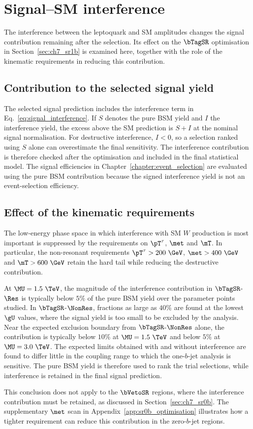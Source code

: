 \chapter{Signal--SM interference}
\label{app:signal_interference_study}

The interference between the leptoquark and SM amplitudes changes the signal contribution remaining after the selection.
Its effect on the $\bTagSR$ optimisation in Section~\ref{sec:ch7_sr1b} is examined here, together with the role of the kinematic requirements in reducing this contribution.

\section{Contribution to the selected signal yield}

The selected signal prediction includes the interference term in Eq.~\ref{eq:signal_interference}.
If $S$ denotes the pure BSM yield and $I$ the interference yield, the excess above the SM prediction is $S+I$ at the nominal signal normalisation.
For destructive interference, $I<0$, so a selection ranked using $S$ alone can overestimate the final sensitivity.
The interference contribution is therefore checked after the optimisation and included in the final statistical model.
The signal efficiencies in Chapter~\ref{chapter:event_selection} are evaluated using the pure BSM contribution because the signed interference yield is not an event-selection efficiency.

\section{Effect of the kinematic requirements}

The low-energy phase space in which interference with SM $W$ production is most important is suppressed by the requirements on $\pT^\tau$, $\met$ and $\mT$.
In particular, the non-resonant requirements $\pT^\tau>200~\GeV$, $\met>400~\GeV$ and $\mT>600~\GeV$ retain the hard tail while reducing the destructive contribution.

At $\MU=1.5~\TeV$, the magnitude of the interference contribution in $\bTagSR$-$\Res$ is typically below $5\%$ of the pure BSM yield over the parameter points studied.
In $\bTagSR$-$\NonRes$, fractions as large as $40\%$ are found at the lowest $\gU$ values, where the signal yield is too small to be excluded by the analysis.
Near the expected exclusion boundary from $\bTagSR$-$\NonRes$ alone, the contribution is typically below $10\%$ at $\MU=1.5~\TeV$ and below $5\%$ at $\MU=3.0~\TeV$.
The expected limits obtained with and without interference are found to differ little in the coupling range to which the one-$b$-jet analysis is sensitive.
The pure BSM yield is therefore used to rank the trial selections, while interference is retained in the final signal prediction.

This conclusion does not apply to the $\bVetoSR$ regions, where the interference contribution must be retained, as discussed in Section~\ref{sec:ch7_sr0b}.
The supplementary $\met$ scan in Appendix~\ref{app:sr0b_optimisation} illustrates how a tighter requirement can reduce this contribution in the zero-$b$-jet regions.
